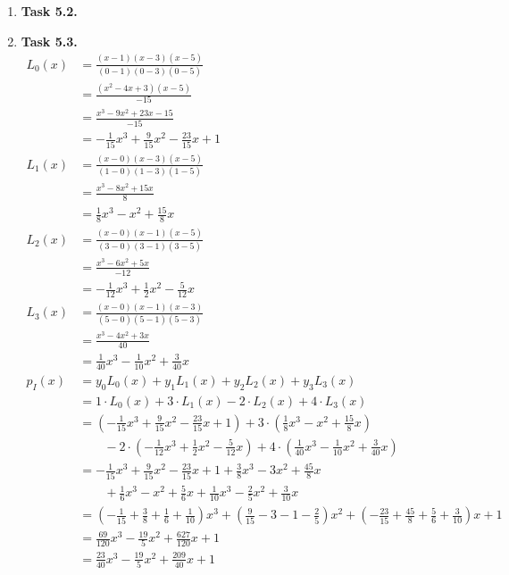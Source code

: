 \documentclass[a4paper,11pt]{article}
\begin{document}
\begin {enumerate}
		The code is the following and can be found in 5.1.py:
		
		
		
	\item[\textbf{Task 5.2.}]
		
	\item[\textbf{Task 5.3.}]
		\begin{align*}
			L_0(x) &= \frac{(x-1)(x-3)(x-5)}{(0-1)(0-3)(0-5)}\\
					&= \frac{(x^2 - 4x + 3)(x-5)}{-15}\\
					&= \frac{x^3 - 9x^2 + 23x -15}{-15}\\
					&= - \frac{1}{15} x^3 + \frac{9}{15} x^2 - \frac{23}{15} x + 1\\
			L_1(x) &= \frac{(x-0)(x-3)(x-5)}{(1-0)(1-3)(1-5)}\\
					&= \frac{x^3 - 8x^2 + 15x}{8}\\
					&= \frac{1}{8} x^3 - x^2 + \frac{15}{8} x\\
			L_2(x) &= \frac{(x-0)(x-1)(x-5)}{(3-0)(3-1)(3-5)}\\
					&= \frac{x^3 - 6x^2 + 5x}{-12}\\
					&= -\frac{1}{12} x^3 + \frac{1}{2} x^2 - \frac{5}{12} x\\
			L_3(x) &= \frac{(x-0)(x-1)(x-3)}{(5-0)(5-1)(5-3)}\\
					&= \frac{x^3 - 4x^2 + 3x}{40}\\
					&= \frac{1}{40} x^3 - \frac{1}{10} x^2 + \frac{3}{40} x\\
			p_I(x) &= y_0 L_0(x) + y_1 L_1(x) + y_2 L_2(x) + y_3 L_3(x)\\
					&= 1 \cdot L_0(x) + 3 \cdot L_1(x) - 2 \cdot L_2(x) + 4 \cdot L_3(x)\\
					&= \left(- \frac{1}{15} x^3 + \frac{9}{15} x^2 - \frac{23}{15} x + 1 \right) + 3 \cdot \left(\frac{1}{8} x^3 - x^2 + \frac{15}{8} x\right)\\
					&\qquad - 2 \cdot \left(-\frac{1}{12} x^3 + \frac{1}{2} x^2 - \frac{5}{12} x \right) + 4 \cdot \left(\frac{1}{40} x^3 - \frac{1}{10} x^2 + \frac{3}{40} x \right)\\
					&= - \frac{1}{15} x^3 + \frac{9}{15} x^2 - \frac{23}{15} x + 1 + \frac{3}{8} x^3 - 3x^2 + \frac{45}{8} x\\
					&\qquad + \frac{1}{6} x^3 - x^2 + \frac{5}{6} x + \frac{1}{10} x^3 - \frac{2}{5} x^2 + \frac{3}{10} x\\
					&= \left( -\frac{1}{15} + \frac{3}{8} + \frac{1}{6} + \frac{1}{10} \right) x^3 + \left( \frac{9}{15} - 3 - 1 - \frac{2}{5} \right) x^2 + \left( -\frac{23}{15} + \frac{45}{8} + \frac{5}{6} + \frac{3}{10} \right) x + 1 \\
					&= \frac{69}{120} x^3 -\frac{19}{5} x^2 + \frac{627}{120} x + 1 \\
					&= \frac{23}{40} x^3 -\frac{19}{5} x^2 + \frac{209}{40} x + 1\\
		\end{align*}
	

\end{enumerate}
\end{document}
